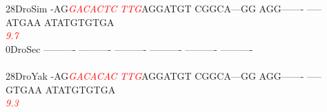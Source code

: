 \documentclass[11pt,twoside,reqno,a4paper]{article}
\begin{document}
{28\hspace*{2\charwidth}DroSim	-AG\textit{\textcolor{Red}{G}}\textit{\textcolor{Red}{A}}\textit{\textcolor{Red}{C}}\textit{\textcolor{Red}{A}}\textit{\textcolor{Red}{C}}\textit{\textcolor{Red}{T}}\textit{\textcolor{Red}{C}}	\textit{\textcolor{Red}{T}}\textit{\textcolor{Red}{T}}\textit{\textcolor{Red}{G}}AGGATGT	CGGCA---GG	AGG-------	-----ATGAA	ATATGTGTGA	\\
\hspace*{4\charwidth}\hspace*{7\charwidth}\hspace*{3\charwidth}\textit{\textcolor{Red}{9.7}}\hspace*{1\charwidth}\hspace*{1\charwidth}\hspace*{1\charwidth}\hspace*{1\charwidth}\hspace*{1\charwidth}\hspace*{1\charwidth}\\
0\hspace*{3\charwidth}DroSec	----------	----------	----------	----------	----------	----------	\\
\hspace*{4\charwidth}\hspace*{7\charwidth}\hspace*{1\charwidth}\hspace*{1\charwidth}\hspace*{1\charwidth}\hspace*{1\charwidth}\hspace*{1\charwidth}\hspace*{1\charwidth}\\
28\hspace*{2\charwidth}DroYak	-AG\textit{\textcolor{Red}{G}}\textit{\textcolor{Red}{A}}\textit{\textcolor{Red}{C}}\textit{\textcolor{Red}{A}}\textit{\textcolor{Red}{C}}\textit{\textcolor{Red}{A}}\textit{\textcolor{Red}{C}}	\textit{\textcolor{Red}{T}}\textit{\textcolor{Red}{T}}\textit{\textcolor{Red}{G}}AGGATGT	CGGCA---GG	AGG-------	-----GTGAA	ATATGTGTGA	\\
\hspace*{4\charwidth}\hspace*{7\charwidth}\hspace*{3\charwidth}\textit{\textcolor{Red}{9.3}}\hspace*{1\charwidth}\hspace*{1\charwidth}\hspace*{1\charwidth}\hspace*{1\charwidth}\hspace*{1\charwidth}\hspace*{1\charwidth}\\
}
\end{document}
